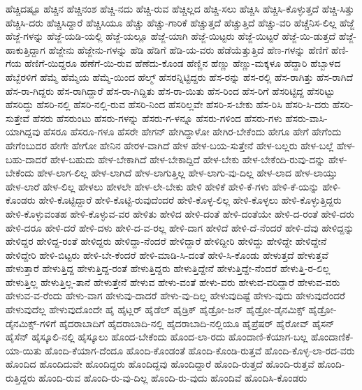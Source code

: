 {ಹೆಚ್ಚಿದಷ್ಟೂ
ಹೆಚ್ಚಿನ
ಹೆಚ್ಚಿನಂಶ
ಹೆಚ್ಚಿ-ನದು
ಹೆಚ್ಚಿ-ರುವ
ಹೆಚ್ಚಿಲ್ಲದ
ಹೆಚ್ಚಿ-ಸಲು
ಹೆಚ್ಚಿಸಿ
ಹೆಚ್ಚಿಸಿ-ಕೊಳ್ಳುತ್ತದೆ
ಹೆಚ್ಚಿ-ಸಿತ್ತು
ಹೆಚ್ಚಿಸಿ-ದರು
ಹೆಚ್ಚಿಸಿದ್ದಾರೆ
ಹೆಚ್ಚಿಸಿಯೂ
ಹೆಚ್ಚು
ಹೆಚ್ಚು-ಗಾರಿಕೆ
ಹೆಚ್ಚುತ್ತದೆ
ಹೆಚ್ಚುತ್ತಿದೆ
ಹೆಚ್ಚು-ವರಿ
ಹೆಚ್ಚೆನಿಸ-ಲಿಲ್ಲ
ಹೆಜ್ಜೆ
ಹೆಜ್ಜೆ-ಗಳನ್ನು
ಹೆಜ್ಜೆ-ಯಡಿ-ಯಲ್ಲಿ
ಹೆಜ್ಜೆ-ಯಲ್ಲೂ
ಹೆಜ್ಜೆ-ಯಾಗಿ
ಹೆಜ್ಜೆ-ಯಿಟ್ಟರು
ಹೆಜ್ಜೆ-ಯಿಟ್ಟರೆ
ಹೆಜ್ಜೆ-ಯಿ-ಡುತ್ತದೆ
ಹೆಜ್ಜೆ-ಹಾಕುತ್ತಿದ್ದಾಗ
ಹೆಜ್ಜೇನು
ಹೆಜ್ಜೇನು-ಗಳನ್ನು
ಹೆಡಿ
ಹೆಡಿಗೆ
ಹೆಡಿ-ಯ-ವರು
ಹೆಡೆಯೆತ್ತುತ್ತಿದೆ
ಹೆಣ-ಗಳನ್ನು
ಹೆಣಿಗೆ
ಹೆಣಿ-ಗೆಯ
ಹೆಣಿಗೆ-ಯಿದ್ದರೂ
ಹೆಣೆಗೆ-ಯಿ-ರುವ
ಹೆಣೆದು-ಕೊಂಡ
ಹೆಣ್ಣಿನ
ಹೆಣ್ಣು
ಹೆಣ್ಣು-ಮಕ್ಕಳೂ
ಹೆದ್ದಾರಿ
ಹೆಬ್ಬಾಳದ
ಹೆಬ್ಬೆರಳಿಗೆ
ಹೆಮ್ಮೆ
ಹೆಮ್ಮೆಯ
ಹೆಮ್ಮೆ-ಯಿಂದ
ಹೆಲ್ಮ್
ಹೆಸರನ್ನಿಟ್ಟಿದ್ದರು
ಹೆಸ-ರನ್ನು
ಹೆಸ-ರಲ್ಲಿ
ಹೆಸ-ರಾಗಿತ್ತು
ಹೆಸ-ರಾಗಿದೆ
ಹೆಸ-ರಾ-ಗಿದ್ದರು
ಹೆಸ-ರಾಗಿದ್ದಾರೆ
ಹೆಸ-ರಾ-ಗಿದ್ದಿತು
ಹೆಸ-ರಾ-ಯಿತು
ಹೆಸ-ರಿಂದ
ಹೆಸ-ರಿಗೆ
ಹೆಸರಿಟ್ಟಿದ್ದ
ಹೆಸರಿಟ್ಟು
ಹೆಸರಿದ್ದು
ಹೆಸರಿ-ನಲ್ಲಿ
ಹೆಸರಿ-ನಲ್ಲಿ-ರುವ
ಹೆಸರಿ-ನಿಂದ
ಹೆಸರಿಲ್ಲವೇ
ಹೆಸರಿ-ಸ-ಬೇಕು
ಹೆಸ-ರಿಸಿ
ಹೆಸರಿ-ಸಿ-ದರು
ಹೆಸರಿ-ಸುತ್ತೇವೆ
ಹೆಸರು
ಹೆಸರುಂಟು
ಹೆಸರು-ಗಳನ್ನು
ಹೆಸರು-ಗ-ಳನ್ನೂ
ಹೆಸರು-ಗಳಿಂದ
ಹೆಸರು-ಗಳು
ಹೆಸರು-ವಾಸಿ-ಯಾಗಿದ್ದವು
ಹೆಸರೂ
ಹೆಸರೂ-ಗಳೂ
ಹೆಸರೇ
ಹೇಗನ್
ಹೇಗಿದ್ದಾಳೋ
ಹೇಗಿರ-ಬೇಕೆಂದು
ಹೇಗೂ
ಹೇಗೆ
ಹೇಗೆಂದು
ಹೇಗೆಂಬುದರ
ಹೇಗೇ
ಹೇಗೋ
ಹೇನಿನ
ಹೇರಳ-ವಾಗಿದೆ
ಹೇಳ
ಹೇಳ-ಬಯ-ಸುತ್ತೇನೆ
ಹೇಳ-ಬಲ್ಲರು
ಹೇಳ-ಬಲ್ಲೆ
ಹೇಳ-ಬಹು-ದಾದರೆ
ಹೇಳ-ಬಹುದು
ಹೇಳ-ಬೇಕಾಗಿದೆ
ಹೇಳ-ಬೇಕಾದ್ದಿದೆ
ಹೇಳ-ಬೇಕು
ಹೇಳ-ಬೇಕೆಂದಿ-ರುವು-ದನ್ನು
ಹೇಳ-ಬೇಕೆಂದು
ಹೇಳ-ಲಾಗ-ಲಿಲ್ಲ
ಹೇಳ-ಲಾಗಿದೆ
ಹೇಳ-ಲಾಗುತ್ತಿಲ್ಲ
ಹೇಳ-ಲಾಗು-ವು-ದಿಲ್ಲ
ಹೇಳ-ಲಾದ
ಹೇಳ-ಲಾಯ್ತು
ಹೇಳ-ಲಾರೆ
ಹೇಳ-ಲಿಲ್ಲ
ಹೇಳಲು
ಹೇಳಲೇ
ಹೇಳ-ಲೇ-ಬೇಕು
ಹೇಳಿ
ಹೇಳಿಕೆ
ಹೇಳಿ-ಕೆ-ಗಳು
ಹೇಳಿ-ಕೆ-ಯನ್ನು
ಹೇಳಿ-ಕೊಂಡರು
ಹೇಳಿ-ಕೊಟ್ಟಿದ್ದಾರೆ
ಹೇಳಿ-ಕೊಟ್ಟಿ-ರುವುದೆಂದರೆ
ಹೇಳಿ-ಕೊಳ್ಳ-ಲಿಲ್ಲ
ಹೇಳಿ-ಕೊಳ್ಳಲು
ಹೇಳಿ-ಕೊಳ್ಳುತ್ತಿದ್ದರು
ಹೇಳಿ-ಕೊಳ್ಳುವಂತಹ
ಹೇಳಿ-ಕೊಳ್ಳುವ-ವರ
ಹೇಳಿತು
ಹೇಳಿದ
ಹೇಳಿ-ದಂತೆ
ಹೇಳಿ-ದಂತೆಯೇ
ಹೇಳಿ-ದ-ರಂತೆ
ಹೇಳಿ-ದರು
ಹೇಳಿ-ದರೂ
ಹೇಳಿ-ದರೆ
ಹೇಳಿ-ದಳು
ಹೇಳಿ-ದ-ವ-ರಲ್ಲ
ಹೇಳಿ-ದಾಗ
ಹೇಳಿದೆ
ಹೇಳಿ-ದೆ-ನೆಂದರೆ
ಹೇಳಿ-ದೆವು
ಹೇಳಿದ್ದನ್ನು
ಹೇಳಿದ್ದರ
ಹೇಳಿದ್ದ-ರಂತೆ
ಹೇಳಿದ್ದರು
ಹೇಳಿದ್ದಾ-ನೆಂದರೆ
ಹೇಳಿದ್ದಾರೆ
ಹೇಳಿದ್ದೀರಿ
ಹೇಳಿದ್ದು
ಹೇಳಿದ್ದೇ
ಹೇಳಿದ್ದೇನೆ
ಹೇಳಿದ್ದೇರಿ
ಹೇಳಿ-ಬಿಟ್ಟರು
ಹೇಳಿ-ಬೇ-ಕೆಂದರೆ
ಹೇಳಿ-ಮಾಡಿ-ಸಿ-ದಂತೆ
ಹೇಳಿ-ಸಿ-ಕೊಂಡು
ಹೇಳುತ್ತದೆ
ಹೇಳುತ್ತವೆ
ಹೇಳುತ್ತಾರೆ
ಹೇಳುತ್ತಿದ್ದ
ಹೇಳುತ್ತಿದ್ದ-ರಂತೆ
ಹೇಳುತ್ತಿದ್ದರು
ಹೇಳುತ್ತಿದ್ದೇನೆ
ಹೇಳುತ್ತಿದ್ದೇ-ನೆಂದರೆ
ಹೇಳುತ್ತಿ-ರ-ಲಿಲ್ಲ
ಹೇಳುತ್ತಿಲ್ಲ
ಹೇಳುತ್ತಿಲ್ಲ-ತಾನೆ
ಹೇಳುತ್ತೇನೆ
ಹೇಳುವ
ಹೇಳು-ವಂತೆ
ಹೇಳು-ವರು
ಹೇಳುವ-ವರಿದ್ದಾರೆ
ಹೇಳುವ-ವರು
ಹೇಳುವ-ವ-ರೆಂದು
ಹೇಳು-ವಾಗ
ಹೇಳುವು-ದಾದರೆ
ಹೇಳು-ವು-ದಿಲ್ಲ
ಹೇಳುವುದಿಷ್ಟೆ
ಹೇಳು-ವುದು
ಹೇಳುವುದೆಂದರೆ
ಹೇಳುವುದೆಲ್ಲ
ಹೇಳುವುದೊಂದೇ
ಹೈ
ಹೈಟ್ಲರ್
ಹೈಡೆಲ್
ಹೈಡ್ರಿಕ್
ಹೈಡ್ರೋ-ಜನ್
ಹೈಡ್ರೋ-ಡೈನಮಿಕ್ಸ್
ಹೈಡ್ರೋ-ಡೈನಮಿಕ್ಸ್-ಗಳಿಗೆ
ಹೈದರಾಬಾದಿಗೆ
ಹೈದರಾಬಾದಿ-ನಲ್ಲಿ
ಹೈದರಾಬಾದಿ-ನಲ್ಲಿಯೂ
ಹೈಪ್ರೆಷರ್
ಹೈರೋವ್
ಹೈಸನ್
ಹೈಸೆನ್
ಹೈಸ್ಕೂಲಿ-ನಲ್ಲಿ
ಹೈಸ್ಕೂಲು
ಹೊಂದ-ಬೇಕೆಂದು
ಹೊಂದ-ಲಾ-ರದು
ಹೊಂದಾಣಿ-ಕೆಯಾಗ-ಬಲ್ಲ
ಹೊಂದಾಣಿಕೆ-ಯಾ-ಯಿತು
ಹೊಂದಿ-ಕೆಯಾಗ-ದೆಂದೂ
ಹೊಂದಿ-ಕೊಂಡಂತೆ
ಹೊಂದಿ-ಕೊಂಡಿ-ರುತ್ತವೆ
ಹೊಂದಿ-ಕೊಳ್ಳ-ಲಾ-ರದ-ವರು
ಹೊಂದಿದ
ಹೊಂದಿದುವೇ
ಹೊಂದಿದ್ದರು
ಹೊಂದಿದ್ದವು
ಹೊಂದಿದ್ದಾರೆ
ಹೊಂದಿ-ರುತ್ತದೆ
ಹೊಂದಿ-ರುತ್ತವೆ
ಹೊಂದಿ-ರುತ್ತಿದ್ದರು
ಹೊಂದಿ-ರುವ
ಹೊಂದಿ-ರು-ವು-ದಿಲ್ಲ
ಹೊಂದಿ-ರು-ವುದು
ಹೊಂದಿವೆ
ಹೊಂದಿಸಿ-ಕೊಂಡರು
}
